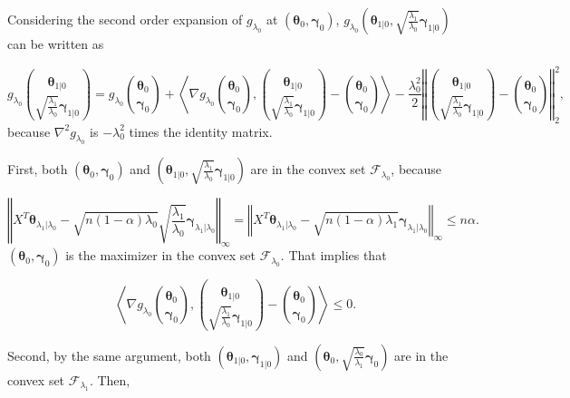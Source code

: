 Considering the second order expansion of $g_{\lambda_0}$ at $(\boldsymbol\theta_{0},\boldsymbol\gamma_{0})$, $g_{\lambda_0}\left(\boldsymbol\theta_{1|0},\sqrt{\frac{\lambda_1}{\lambda_0}}\boldsymbol\gamma_{1|0}\right)$ can be written as

\begin{equation}
    \label{eq:1.1.1}
    g_{\lambda_0}\binom{\boldsymbol\theta_{1|0}}{\sqrt{\frac{\lambda_1}{\lambda_0}}\boldsymbol\gamma_{1|0}}=g_{\lambda_0}\binom{\boldsymbol\theta_{0}}{\boldsymbol\gamma_{0}}+\left\langle\nabla g_{\lambda_0}\binom{\boldsymbol\theta_{0}}{\boldsymbol\gamma_{0}},\binom{\boldsymbol\theta_{1|0}}{\sqrt{\frac{\lambda_1}{\lambda_0}}\boldsymbol\gamma_{1|0}}-\binom{\boldsymbol\theta_{0}}{\boldsymbol\gamma_{0}}\right\rangle-\frac{\lambda_0^2}{2}\left\Vert\binom{\boldsymbol\theta_{1|0}}{\sqrt{\frac{\lambda_1}{\lambda_0}}\boldsymbol\gamma_{1|0}}-\binom{\boldsymbol\theta_{0}}{\boldsymbol\gamma_{0}}\right\Vert_2^2,
\end{equation}
because $\nabla^2g_{\lambda_0}$ is $-\lambda_0^2$ times the identity matrix. 

First, both $(\boldsymbol\theta_{0},\boldsymbol\gamma_{0})$ and $\left(\boldsymbol\theta_{1|0},\sqrt{\frac{\lambda_1}{\lambda_0}}\boldsymbol\gamma_{1|0}\right)$ are in the convex set $\mathcal{F}_{\lambda_0}$, because

\begin{equation}
    \left\Vert X^T\boldsymbol\theta_{\lambda_1|\lambda_0}-\sqrt{n(1-\alpha)\lambda_0}\sqrt{\frac{\lambda_1}{\lambda_0}}\boldsymbol\gamma_{\lambda_1|\lambda_0}\right\Vert_\infty= \left\Vert X^T\boldsymbol\theta_{\lambda_1|\lambda_0}-\sqrt{n(1-\alpha)\lambda_1}\boldsymbol\gamma_{\lambda_1|\lambda_0}\right\Vert_\infty\leq n\alpha.
\end{equation}
$(\boldsymbol\theta_{0},\boldsymbol\gamma_{0})$ is the maximizer in the convex set $\mathcal{F}_{\lambda_0}$. That implies that

\begin{equation}
    \label{eq:1.1.2}
    \left\langle\nabla g_{\lambda_0}\binom{\boldsymbol\theta_{0}}{\boldsymbol\gamma_{0}},\binom{\boldsymbol\theta_{1|0}}{\sqrt{\frac{\lambda_1}{\lambda_0}}\boldsymbol\gamma_{1|0}}-\binom{\boldsymbol\theta_{0}}{\boldsymbol\gamma_{0}}\right\rangle\leq 0.
\end{equation}

Second, by the same argument, both $(\boldsymbol\theta_{1|0},\boldsymbol\gamma_{1|0})$ and $\left(\boldsymbol\theta_{0},\sqrt{\frac{\lambda_0}{\lambda_1}}\boldsymbol\gamma_{0}\right)$ are in the convex set $\mathcal{F}_{\lambda_1}$. Then,

